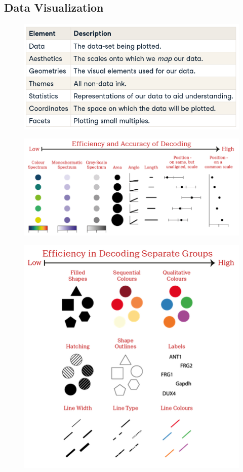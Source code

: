 \documentclass{article}
\begin{document}
\begin{multicols}{2}
\section{Data Visualization}
\begin{figure}[H]
	\centering
	\includegraphics[width=\columnwidth]{img/ggplot.png}
\end{figure}
\begin{figure}[H]
	\centering
	\includegraphics[width=\columnwidth]{img/aes.png}
\end{figure}
\begin{figure}[H]
	\centering
	\includegraphics[width=\columnwidth]{img/aes2.png}
\end{figure}


\end{multicols}
\end{document}
